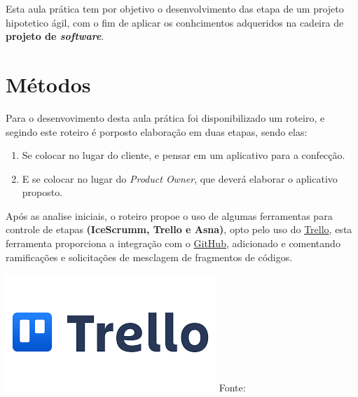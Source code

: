 \par Esta aula prática tem por objetivo o desenvolvimento das etapa de um projeto hipotetico ágil, com o fim de aplicar os conhcimentos adqueridos na cadeira de \textbf{projeto de \textit{software}}.

\section{Métodos}
\par Para o desenvovimento desta aula prática foi disponibilizado um roteiro, e segindo este roteiro é porposto elaboração em duas etapas, sendo elas:
\begin{enumerate}
  \item Se colocar no lugar do cliente, e pensar em um aplicativo para a confecção.
  \item E se colocar no lugar do \textit{Product Owner}, que deverá elaborar o aplicativo proposto.
\end{enumerate}


\noindent \begin{minipage}[c]{0.6\textwidth}
  \vspace {1cm}
\par Após as analise iniciais, o roteiro propoe o uso de algumas ferramentas para controle de etapas \textbf{(IceScrumm, Trello e Asna)}, opto pelo uso do \href{https://trello.com/home}{Trello}, esta ferramenta proporciona a integração com o \href{www.github.com}{GitHub}, adicionado e comentando ramificações e solicitações de mesclagem de fragmentos de códigos.

\end{minipage}
\begin{minipage}[c]{0.4\textwidth}
  \includegraphics[width=\textwidth]{figure/trello.png}
  \label{fig:log_trello}
  {\fontsize{10pt}{\baselineskip} \selectfont Fonte: }
\end{minipage}




